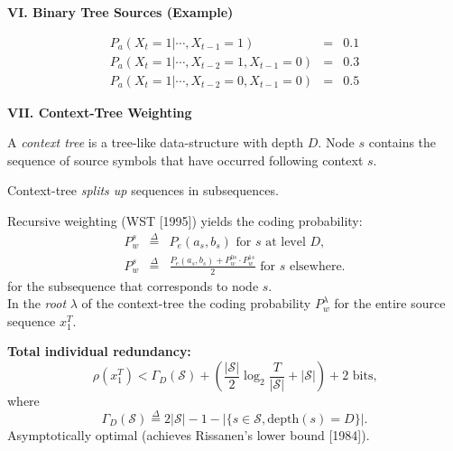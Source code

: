 \documentclass[a4paper,landscape]{slides} %
\newcommand{\cS}{{\mathcal{S}}}
\newcommand{\define}{\stackrel{\Delta}{=}}
\newcommand{\xT}{x_{1}^{T}}
\newcommand{\GD}{{\Gamma_{D}}}
\begin{document}
\begin{slide}{\bf\Large\color{blue} VI. Binary Tree Sources (Example)}
\begin{center}

\end{center}
\begin{eqnarray*}
P_{a}(X_{t}=1|\cdots,X_{t-1}=1)           &=& 0.1 \\
P_{a}(X_{t}=1|\cdots,X_{t-2}=1,X_{t-1}=0) &=& 0.3 \\
P_{a}(X_{t}=1|\cdots,X_{t-2}=0,X_{t-1}=0) &=& 0.5
\end{eqnarray*}
\end{slide}
\begin{slide}{\bf\Large\color{blue} VII. Context-Tree Weighting}

A {\em context tree} is a tree-like data-structure with depth $D$.
Node $s$ contains the
sequence of source symbols that have occurred following context
$s$.
\begin{center}

\end{center}
\end{slide}
\begin{slide}
Context-tree {\em splits up} sequences in subsequences.
\begin{center}

\end{center}
\end{slide}
\begin{slide}
Recursive weighting (WST [1995]) yields the coding probability:
\begin{eqnarray*}
P_w^s &\define& P_e(a_s,b_s) \text{ for $s$ at level $D$,} \\
P_{w}^{s} &\define& \frac{P_{e}(a_{s},b_{s}) + P_{w}^{0s}\cdot P_{w}^{1s}}{2} \text{ for $s$ elsewhere.}
\end{eqnarray*}
for the subsequence that corresponds to node $s$. \\
In the {\em root} $\lambda$ of the context-tree the coding probability $P_{w}^{\lambda}$ for the entire source sequence
$\xT$.

{\bf Total individual redundancy:}
\[
\rho(\xT) <
\GD(\mathcal{S}) + \left( \frac{|\cS|}{2}\log_{2}\frac{T}{|\cS|} + |\cS| \right)
+ 2\text{ bits,}
\]
where
\begin{equation*}
\GD(\cS) \define 2|\cS| - 1 - |\{ s\in\cS, \mbox{depth$(s) = D$} \}|. %
\end{equation*}
Asymptotically optimal (achieves Rissanen's lower bound [1984]).
\end{slide}
\end{document}
